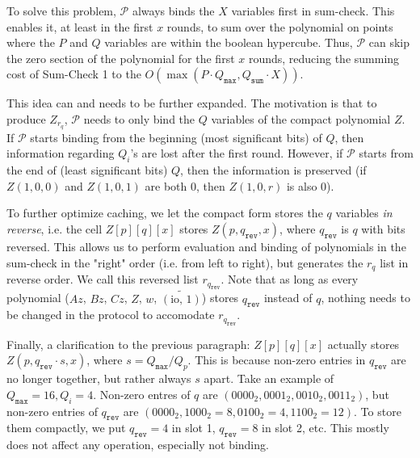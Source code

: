 \documentclass{article}
\newcommand{\Qsum}{Q_{\mathtt{sum}}}
\newcommand{\Qmax}{Q_{\mathtt{max}}}
\newcommand{\qrev}{q_{\mathtt{rev}}}
\renewcommand{\P}{\mathcal{P}}
\newcommand{\io}{\widetilde{(\mbox{io, 1})}}
\begin{document}
To solve this problem, $\P$ always binds the $X$ variables first in sum-check. This enables it, at least in the first $x$ rounds, to sum over the polynomial on points where the $P$ and $Q$ variables are within the boolean hypercube. Thus, $\P$ can skip the zero section of the polynomial for the first $x$ rounds, reducing the summing cost of Sum-Check 1 to the $O(\max(P\cdot \Qmax, \Qsum\cdot X))$.

This idea can and needs to be further expanded. The motivation is that to produce $Z_{r_q}$, $\P$ needs to only bind the $Q$ variables of the compact polynomial $Z$. If $\P$ starts binding from the beginning (most significant bits) of $Q$, then information regarding $Q_i$'s are lost after the first round. However, if $\P$ starts from the end of (least significant bits) $Q$, then the information is preserved (if $Z(1, 0, 0)$ and $Z(1, 0, 1)$ are both 0, then $Z(1, 0, r)$ is also 0).

To further optimize caching, we let the compact form stores the $q$ variables \emph{in reverse}, i.e. the cell $Z[p][q][x]$ stores $Z(p, \qrev, x)$, where $\qrev$ is $q$ with bits reversed. This allows us to perform evaluation and binding of polynomials in the sum-check in the "right" order (i.e. from left to right), but generates the $r_q$ list in reverse order. We call this reversed list $r_{\qrev}$. Note that as long as every polynomial ($Az$, $Bz$, $Cz$, $Z$, $w$, $\io$) stores $\qrev$ instead of $q$, nothing needs to be changed in the protocol to accomodate $r_{\qrev}$.

Finally, a clarification to the previous paragraph: $Z[p][q][x]$ actually stores $Z(p, \qrev \cdot s, x)$, where $s = \Qmax / Q_p$. This is because non-zero entries in $\qrev$ are no longer together, but rather always $s$ apart. Take an example of $\Qmax = 16, Q_i = 4$. Non-zero entres of $q$ are $(0000_2, 0001_2, 0010_2, 0011_2)$, but non-zero entries of $\qrev$ are $(0000_2, 1000_2 = 8, 0100_2 = 4, 1100_2 = 12)$. To store them compactly, we put $\qrev = 4$ in slot 1, $\qrev = 8$ in slot 2, etc. This mostly does not affect any operation, especially not binding.
\end{document}
